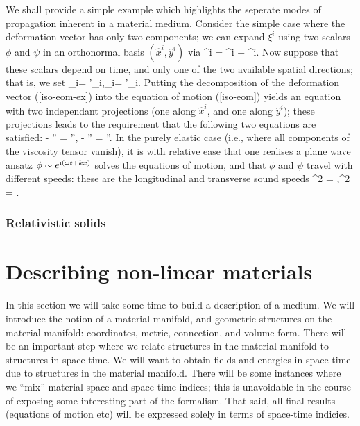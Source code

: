 We shall provide a simple example which highlights the seperate modes of propagation inherent in a material medium. Consider the simple case where the deformation vector has only two components; we can expand $\xi^i$ using two scalars $\phi$ and $\psi$ in an orthonormal basis $(\hat{x}^i, \hat{y}^i)$ via
\bse
\label{iso-eom-ex}
\bea
\xi^i = \phi{}^i + \psi{}^i.
\eea
Now suppose that these scalars depend on time, and only one of the two available spatial directions; that is, we set
\bea
\partial_i\phi = \phi'_i,\qquad \partial_i\psi = \psi'_i.
\eea
\ese
Putting the decomposition of the deformation vector (\ref{iso-eom-ex}) into the equation of motion (\ref{iso-eom}) yields an equation with two independant projections (one along $\hat{x}^i$, and one along $\hat{y}^i$); these projections leads to the requirement that the following two equations are satisfied:
\bea
\ddot{\phi} - \dot{\phi}'' = \phi'',\qquad
\ddot{\psi} - \frac{\nu}{\rho}\dot{\psi}'' = \frac{\mu}{\rho}\psi''.
\eea
In the purely elastic case (i.e., where all components of the viscosity tensor vanish), it is with relative ease that one realises a plane wave ansatz $\phi \sim e^{\textrm{i}\left( \omega t + kx \right)}$ solves the equations of motion, and that $\phi$ and $\psi$ travel with different speeds: these are the  longitudinal and transverse sound speeds
\bea
{}^2 = ,\qquad {}^2 = \frac{\mu}{\rho}.
\eea
\subsubsection{Relativistic solids}



\cleardoublepage
\section{Describing non-linear materials}
In this section we will take some time to build a description of a medium. We will introduce the notion of a material manifold, and geometric structures on the material manifold: coordinates, metric, connection, and volume form. There will be an important step where we relate structures in the material manifold to structures in space-time. We will want to obtain fields and energies in space-time due to structures in the material manifold. There will be some instances where we ``mix'' material space and space-time indices; this is   unavoidable in the course of exposing some interesting part of the formalism. That said, all final results (equations of motion etc) will be expressed solely in terms of space-time indicies.
